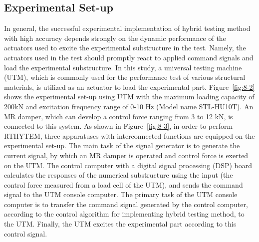 \subsection{Experimental Set-up}
In general, the successful experimental implementation of hybrid testing method with high accuracy depends strongly on the dynamic performance of the actuators used to excite the experimental substructure in the test. Namely, the actuators used in the test should promptly react to applied command signals and load the experimental substructure. In this study, a universal testing machine (UTM), which is commonly used for the performance test of various structural materials, is utilized as an actuator to load the experimental part. Figure~\ref{fig:8-2} shows the experimental set-up using UTM with the maximum loading capacity of 200kN and excitation frequency range of 0-10 Hz (Model name STL-HU10T). An MR damper, which can develop a control force ranging from 3 to 12 kN, is connected to this system. As shown in Figure~\ref{fig:8-3}, in order to perform RTHYTEM, three apparatuses with interconnected functions are equipped on the experimental set-up. The main task of the signal generator is to generate the current signal, by which an MR damper is operated and control force is exerted on the UTM. The control computer with a digital signal processing (DSP) board calculates the responses of the numerical substructure using the input (the control force measured from a load cell of the UTM), and sends the command signal to the UTM console computer. The primary task of the UTM console computer is to transfer the command signal generated by the control computer, according to the control algorithm for implementing hybrid testing method, to the UTM. Finally, the UTM excites the experimental part according to this control signal.

